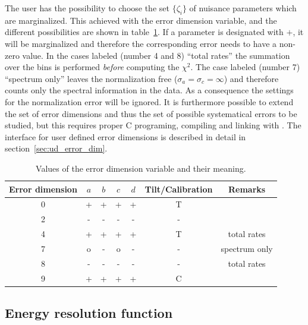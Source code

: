 The user has the possibility to choose the set $\{\zeta_i\}$ of nuisance 
parameters which are marginalized. This achieved with the error dimension 
variable, and the different possibilities are shown in
table~\ref{tab:error_dim}. If a parameter is designated with $+$, it will
be marginalized and therefore the corresponding error needs to have a non-zero
value. In the cases labeled (number 4 and 8) ``total rates'' 
the summation over the bins is performed \emph{before} computing 
the $\chi^2$. The case labeled (number 7) ``spectrum only'' leaves the 
normalization free ($\sigma_a=\sigma_c=\infty$) and therefore counts only the 
spectral information in the data. As a consequence
the settings for the normalization error will be ignored. It is furthermore
possible to extend the set of error dimensions and thus the set of possible 
systematical errors to be studied, but this requires proper C programing, 
compiling and linking with \GLOBES. The interface for user defined error 
dimensions is described in detail in section~\ref{sec:ud_error_dim}.

\begin{center}
\begin{table}[hbt!]
\begin{center}
\begin{tabular}[h]{|c|cccc|c|c|}
\hline
Error dimension&$a$&$b$&$c$&$d$&Tilt/Calibration&Remarks\\
\hline
\hline
0&+&+&+&+&T&\\
2&-&-&-&-&-&\\
4&+&+&+&+&T&total rates\\
7&o&-&o&-&-&spectrum only\\
8&-&-&-&-&-&total rates\\
9&+&+&+&+&C&\\
\hline
\end{tabular}
\caption[Table of error dimensions]{\label{tab:error_dim}
Values of the error dimension variable and their meaning.
 }
\end{center} 
\end{table} 
\end{center}



\subsection{Energy resolution function}
\label{sec:energy}

